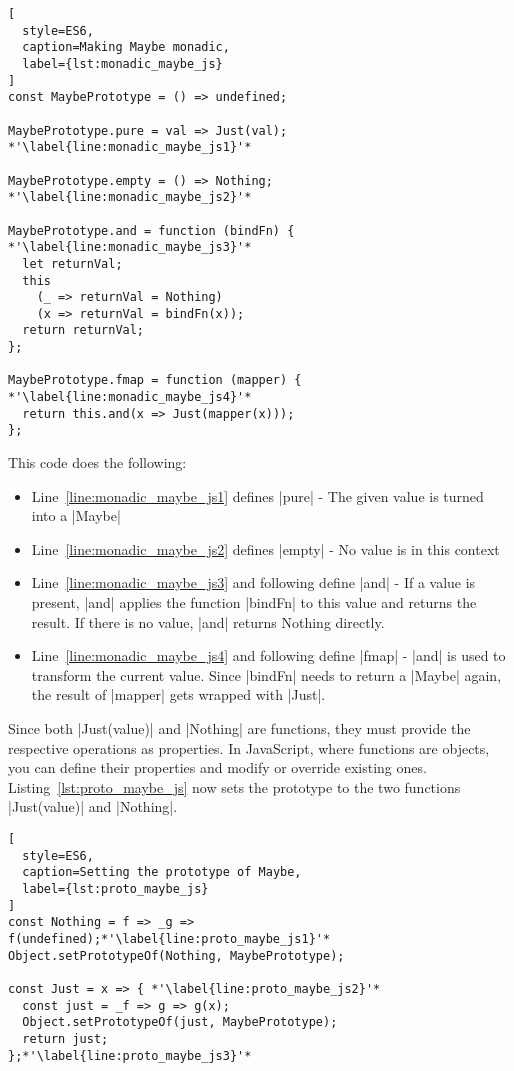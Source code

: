 \begin{lstlisting}[
  style=ES6,
  caption=Making Maybe monadic,
  label={lst:monadic_maybe_js}
]
const MaybePrototype = () => undefined;

MaybePrototype.pure = val => Just(val); *'\label{line:monadic_maybe_js1}'*

MaybePrototype.empty = () => Nothing; *'\label{line:monadic_maybe_js2}'*

MaybePrototype.and = function (bindFn) { *'\label{line:monadic_maybe_js3}'*
  let returnVal;
  this
    (_ => returnVal = Nothing)
    (x => returnVal = bindFn(x));
  return returnVal;
};

MaybePrototype.fmap = function (mapper) { *'\label{line:monadic_maybe_js4}'*
  return this.and(x => Just(mapper(x)));
};
\end{lstlisting}
This code does the following:
\begin{itemize}
  \item Line~\ref{line:monadic_maybe_js1} defines |pure| - The given value is turned
    into a |Maybe|
  \item Line~\ref{line:monadic_maybe_js2} defines |empty| - No value is in this
    context
  \item Line~\ref{line:monadic_maybe_js3} and following define |and| - If a
    value is present, |and| applies the function |bindFn| to this value and
    returns the result. If there is no value, |and| returns Nothing directly.
  \item Line~\ref{line:monadic_maybe_js4} and following define |fmap| - |and|
    is used to transform the current value. Since |bindFn| needs to return a
    |Maybe| again, the result of |mapper| gets wrapped with |Just|.
\end{itemize}

Since both |Just(value)| and |Nothing| are functions, they must provide the respective
operations as properties. In JavaScript, where functions are objects, you can
define their properties and modify or override existing ones. \\
Listing~\ref{lst:proto_maybe_js} now sets the prototype to the two functions
|Just(value)| and |Nothing|.

\begin{lstlisting}[
  style=ES6,
  caption=Setting the prototype of Maybe,
  label={lst:proto_maybe_js}
]
const Nothing = f => _g => f(undefined);*'\label{line:proto_maybe_js1}'*
Object.setPrototypeOf(Nothing, MaybePrototype);

const Just = x => { *'\label{line:proto_maybe_js2}'*
  const just = _f => g => g(x);
  Object.setPrototypeOf(just, MaybePrototype);
  return just;
};*'\label{line:proto_maybe_js3}'*
\end{lstlisting}

